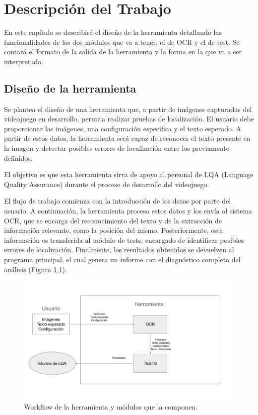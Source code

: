 \chapter{Descripción del Trabajo}
\label{cap:descripcionTrabajo}

En este capítulo se describirá el diseño de la herramienta detallando las funcionalidades de los dos módulos que va a tener, el de OCR y el de test. Se contará el formato de la salida de la herramienta y la forma en la que va a ser interpretada.

\section{Diseño de la herramienta}
\label{sec:Descripción de la herramienta}
Se plantea el diseño de una herramienta que, a partir de imágenes capturadas del videojuego en desarrollo, permita realizar pruebas de localización. El usuario debe proporcionar las imágenes, una configuración específica y el texto esperado. A partir de estos datos, la herramienta será capaz de reconocer el texto presente en la imagen y detectar posibles errores de localización entre los previamente definidos.

El objetivo es que esta herramienta sirva de apoyo al personal de LQA (Language Quality Assurance) durante el proceso de desarrollo del videojuego.

El flujo de trabajo comienza con la introducción de los datos por parte del usuario. A continuación, la herramienta procesa estos datos y los envía al sistema OCR, que se encarga del reconocimiento del texto y de la extracción de información relevante, como la posición del mismo. Posteriormente, esta información es transferida al módulo de tests, encargado de identificar posibles errores de localización. Finalmente, los resultados obtenidos se devuelven al programa principal, el cual genera un informe con el diagnóstico completo del análisis (Figura \ref{fig:Descripcion_Herramienta}).
\begin{figure}[h]
	\centering
	\includegraphics[width = 1\textwidth]{Imagenes/Descripcion_Herramienta.png}
	\caption{Workflow de la herramienta y módulos que la componen.}
	\label{fig:Descripcion_Herramienta}
\end{figure}


